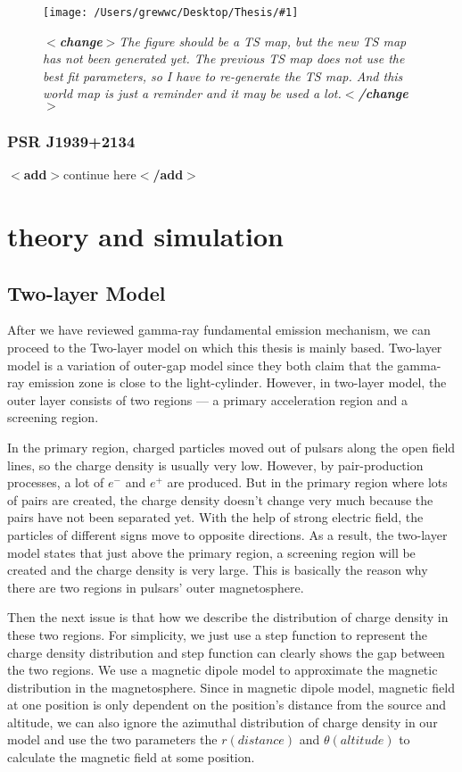 \documentclass[12pt]{report}
\newcommand{\mycaption}[1]{\caption{\textit{\footnotesize #1}}}
\newcommand{\singleFig}[3]{
 \begin{figure}[!ht]
  \centering
  \texttt{[image: /Users/grewwc/Desktop/Thesis/\#1]}
  \mycaption{#3}
 \label{fig: #1}
 \end{figure} 
}
\newcommand{\change}[1]{
  $<$\textbf{change}$>$#1$<$\textbf{/change}$>$
}
\newcommand{\add}[1]{
  $<$\textbf{add}$>$#1$<$\textbf{/add}$>$
}
\begin{document}
              \singleFig{blank.png}{0.3}{\change{The figure should be a TS map, but the new TS map has not been generated yet.
              The previous TS map does not use the best fit parameters, so I have to re-generate the TS map. And this 
              world map is just a reminder and it may be used a lot.}}

            \subsection{PSR J1939+2134}
              \add{continue here}

      
    \chapter{theory and simulation}
      \section{Two-layer Model}
      After we have reviewed gamma-ray fundamental emission mechanism, we can proceed to
      the Two-layer model on which this thesis is mainly based. Two-layer model is a 
      variation of outer-gap model since they both claim that the gamma-ray emission zone
      is close to the light-cylinder. However, in two-layer model, the outer layer 
      consists of two regions --- a primary acceleration region and a screening region. 

      In the primary region, charged particles moved out of pulsars along the open field lines, 
      so the charge density is usually very low. 
      However, by pair-production processes, a lot of $e^{-}$ and $e^{+}$ are produced. 
      But in the primary region where lots of pairs are created, the charge density doesn't 
      change very much because the pairs have not been separated yet. With the help of strong 
      electric field, the particles of different signs move to opposite directions. 
      As a result, the two-layer model states that just above the primary region, a screening 
      region will be created and the charge density is very large. This is basically the reason why 
      there are two regions in pulsars' outer magnetosphere.

      Then the next issue is that how we describe the distribution of charge density in these two regions. 
      For simplicity, we just use a step function to represent the charge density distribution and step function 
      can clearly shows the gap between the two regions. We use a magnetic dipole model to approximate the 
      magnetic distribution in the magnetosphere. Since in magnetic dipole model, magnetic field at one position is 
      only dependent on the position's distance from the source and altitude, we can also ignore the azimuthal 
      distribution of charge density in our model and use the two parameters
      the $r (distance)$ and $\theta (altitude)$ to calculate the magnetic field at some position.
\end{document}
